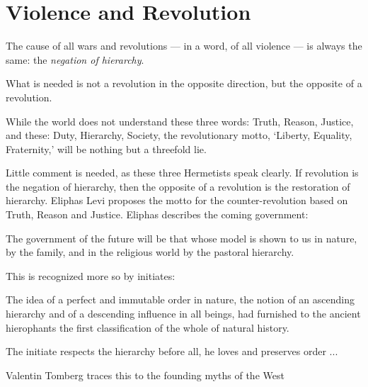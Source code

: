 \section{Violence and Revolution}

\begin{quotex}
The cause of all wars and revolutions --- in a word, of all violence --- is always the same: the \emph{negation of hierarchy}.

What is needed is not a revolution in the opposite direction, but the opposite of a revolution.


While the world does not understand these three words: Truth, Reason, Justice, and these: Duty, Hierarchy, Society, the revolutionary motto, `Liberty, Equality, Fraternity,' will be nothing but a threefold lie.
\end{quotex}


Little comment is needed, as these three Hermetists speak clearly. If revolution is the negation of hierarchy, then the opposite of a revolution is the restoration of hierarchy. Eliphas Levi proposes the motto for the counter-revolution based on Truth, Reason and Justice. Eliphas describes the coming government:

\begin{quotex}
The government of the future will be that whose model is shown to us in nature, by the family, and in the religious world by the pastoral hierarchy.
\end{quotex}


This is recognized more so by initiates:

\begin{quotationx}
The idea of a perfect and immutable order in nature, the notion of an ascending hierarchy and of a descending influence in all beings, had furnished to the ancient hierophants the first classification of the whole of natural history.

The initiate respects the hierarchy before all, he loves and preserves order ... 
\end{quotationx}


Valentin Tomberg traces this to the founding myths of the West

